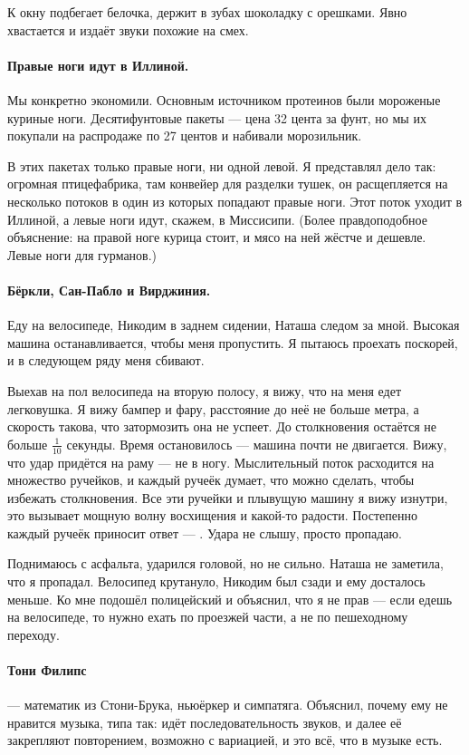 \documentclass{book}
\begin{document}
К окну подбегает белочка, держит в зубах шоколадку с орешками. 
Явно хвастается и издаёт звуки похожие на смех.

\paragraph{Правые ноги идут в Иллиной.}
Мы конкретно экономили.
Основным источником протеинов были мороженые куриные ноги.
Десятифунтовые пакеты --- цена 32 цента за фунт, но мы их покупали на распродаже по 27 центов и набивали морозильник.

В этих пакетах только правые ноги, ни одной левой.
Я представлял дело так: огромная птицефабрика, там конвейер для разделки тушек,
он расщепляется на несколько потоков в один из которых попадают правые ноги.
Этот поток уходит в Иллиной, а левые ноги идут, скажем, в Миссисипи.
(Более правдоподобное объяснение: на правой ноге курица стоит, и мясо на ней жёстче и дешевле.
Левые ноги для гурманов.) 

\paragraph{Бёркли, Сан-Пабло и Вирджиния.}
Еду на велосипеде, Никодим в заднем сидении, Наташа следом за мной.
Высокая машина останавливается, чтобы меня пропустить.
Я пытаюсь проехать поскорей, и в следующем ряду меня сбивают.

Выехав на пол велосипеда на вторую полосу, я вижу, что на меня едет легковушка.
Я вижу бампер и фару, расстояние до неё не больше метра, а скорость такова, что затормозить она не успеет.
До столкновения остаётся не больше $\tfrac1{10}$ секунды.
Время остановилось --- машина почти не двигается.
Вижу, что удар придётся на раму --- не в ногу.
Мыслительный поток расходится на множество ручейков, и каждый ручеёк думает, что можно сделать, чтобы избежать столкновения.
Все эти ручейки и плывущую машину я вижу изнутри, это вызывает мощную волну восхищения и какой-то радости.
Постепенно каждый ручеёк приносит ответ --- 
.
Удара не слышу, просто пропадаю.

Поднимаюсь с асфальта, ударился головой, но не сильно.
Наташа не заметила, что я пропадал.
Велосипед крутануло, Никодим был сзади и ему досталось меньше.
Ко мне подошёл полицейский и объяснил, что я не прав --- если едешь на велосипеде, то нужно ехать по проезжей части, а не по пешеходному переходу.

\paragraph{Тони Филипс} --- математик из Стони-Брука, ньюёркер и симпатяга.
Объяснил, почему ему не нравится музыка, типа так:
идёт последовательность звуков, и далее её закрепляют повторением, возможно с вариацией, и это всё, что в музыке есть.
\end{document}

